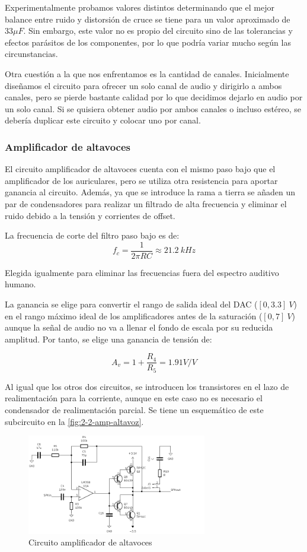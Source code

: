 Experimentalmente probamos valores distintos determinando que el mejor balance entre ruido y distorsión de cruce se tiene para un valor aproximado de $33 \mu F$. Sin embargo, este valor no es propio del circuito sino de las tolerancias y efectos parásitos de los componentes, por lo que podría variar mucho según las circunstancias.

Otra cuestión a la que nos enfrentamos es la cantidad de canales. Inicialmente diseñamos el circuito para ofrecer un solo canal de audio y dirigirlo a ambos canales, pero se pierde bastante calidad por lo que decidimos dejarlo en audio por un solo canal. Si se quisiera obtener audio por ambos canales o incluso estéreo, se debería duplicar este circuito y colocar uno por canal.

\subsubsection{Amplificador de altavoces}

El circuito amplificador de altavoces cuenta con el mismo paso bajo que el amplificador de los auriculares, pero se utiliza otra resistencia para aportar ganancia al circuito. Además, ya que se introduce la rama a tierra se añaden un par de condensadores para realizar un filtrado de alta frecuencia y eliminar el ruido debido a la tensión y corrientes de offset.

La frecuencia de corte del filtro paso bajo es de:
\[
    f_c = \frac{1}{2\pi RC} \approx 21.2\ kHz
\]

Elegida igualmente para eliminar las frecuencias fuera del espectro auditivo humano.

La ganancia se elige para convertir el rango de salida ideal del DAC ($[0, 3.3]\ V$) en el rango máximo ideal de los amplificadores antes de la saturación ($[0, 7]\ V$) aunque la señal de audio no va a llenar el fondo de escala por su reducida amplitud. Por tanto, se elige una ganancia de tensión de:

\[
    A_v = 1 + \frac{R_4}{R_5} = 1.91 V/V
\]

Al igual que los otros dos circuitos, se introducen los transistores en el lazo de realimentación para la corriente, aunque en este caso no es necesario el condensador de realimentación parcial. Se tiene un esquemático de este subcircuito en la \autoref{fig:2-2-amp-altavoz}.

\begin{figure}[h]
    \centering
    \includegraphics[width=0.7\textwidth]{images/2/2-2/circuitoAmplificadorAltavoces.png}
    \caption{Circuito amplificador de altavoces}
    \label{fig:2-2-amp-altavoz}
\end{figure}

